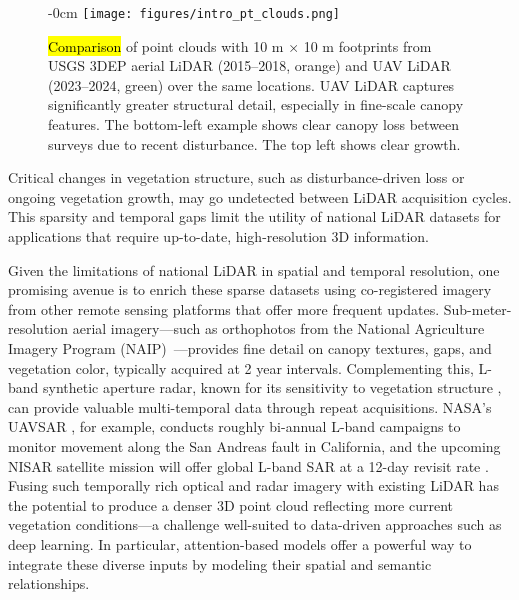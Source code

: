 \documentclass[remotesensing,article,accept,pdftex,moreauthors]{Definitions/mdpi}
\begin{document}
\vspace{-5pt}
\begin{figure}[H]
\begin{adjustwidth}{-\extralength}{0cm}
    \centering
    \texttt{[image: figures/intro\_pt\_clouds.png]}
\end{adjustwidth}
\caption{\hl{Comparison} %
 of point clouds with 10 m × 10 m footprints from USGS 3DEP aerial LiDAR (2015--2018, orange) and UAV LiDAR (2023--2024, green) over the same locations. UAV LiDAR captures significantly greater structural detail, especially in fine-scale canopy features. The bottom-left example shows clear canopy loss between surveys due to recent disturbance. The top left shows clear growth.}
    \label{fig:intro_pt_clouds}
\end{figure} 


Critical changes in vegetation structure, such as disturbance-driven loss or ongoing vegetation growth, may go undetected between LiDAR acquisition cycles. This sparsity and temporal gaps limit the utility of national LiDAR datasets for applications that require up-to-date, high-resolution 3D information.

Given the limitations of national LiDAR in spatial and temporal resolution, one promising avenue is to enrich these sparse datasets using co-registered imagery from other remote sensing platforms that offer more frequent updates. Sub-meter-resolution aerial imagery—such as orthophotos from the National Agriculture Imagery Program (NAIP)~\cite{usda_naip_2024}—provides fine detail on canopy textures, gaps, and vegetation color, typically acquired at 2 year intervals. Complementing this, L-band synthetic aperture radar, known for its sensitivity to vegetation structure \cite{wang2025interpretable}, can provide valuable multi-temporal data through repeat acquisitions. NASA’s UAVSAR \cite{rosen2006uavsar}, for example, conducts roughly bi-annual L-band campaigns to monitor movement along the San Andreas fault in California, and the upcoming NISAR satellite mission will offer global L-band SAR at a 12-day revisit rate \cite{kellogg2020nasa}. Fusing such temporally rich optical and radar imagery with existing LiDAR has the potential to produce a denser 3D point cloud reflecting more current vegetation conditions—a challenge well-suited to data-driven approaches such as deep learning. In particular, attention-based models offer a powerful way to integrate these diverse inputs by modeling their spatial and semantic relationships.
\end{document}
